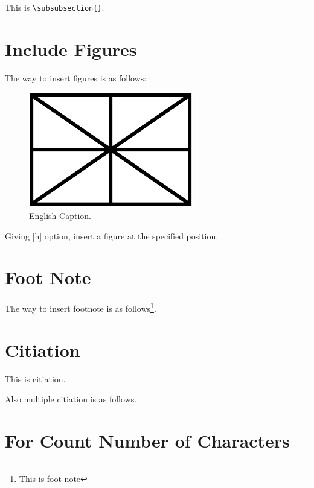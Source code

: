 \documentclass{jsarticle}
\begin{document}
This is \verb|\subsubsection{}|.

\section{Include Figures}

The way to insert figures is as follows:

\begin{figure}[h]
\centerline{
	\includegraphics[mediaboxonly,width=\columnwidth]{figure.pdf}}
\caption{English Caption.}
\label{fig:figure}
\end{figure}

Giving [h] option, insert a figure at the specified position.

\section{Foot Note}

The way to insert footnote is as follows\footnote{This is foot note}.

\section{Citiation}

This is citiation\cite{Author1:08}.

Also multiple citiation is as follows\cite{Author1:08,Author2:09}.

\section{For Count Number of Characters}
\end{document}
